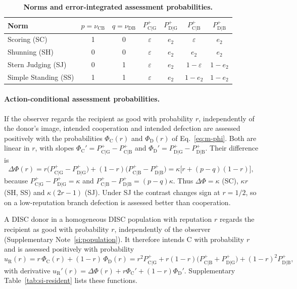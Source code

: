 \documentclass[fleqn,10pt]{wlscirep}
\newcommand{\Pp}[1]{P^{+}_{\mathrm{#1}}}   %
\newcommand{\PhiC}{\Phi_{\mathrm{C}}}
\newcommand{\PhiD}{\Phi_{\mathrm{D}}}
\theoremstyle{plain}
\begin{document}
\begin{table}[!htbp]
\centering
\caption{\textbf{Norms and error-integrated assessment probabilities.}}
\label{tab:si-norms}
\small
\begin{tabular}{@{}lcccccc@{}}
\toprule
Norm & $p=\nu_{\mathrm{CB}}$ & $q=\nu_{\mathrm{DB}}$ & $\Pp{C|G}$ & $\Pp{D|G}$ & $\Pp{C|B}$ & $\Pp{D|B}$\\
\midrule
Scoring (SC) & 1 & 0 & $\varepsilon$ & $e_2$ & $\varepsilon$ & $e_2$\\
Shunning (SH) & 0 & 0 & $\varepsilon$ & $e_2$ & $e_2$ & $e_2$\\
Stern Judging (SJ) & 0 & 1 & $\varepsilon$ & $e_2$ & $1-\varepsilon$ & $1-e_2$\\
Simple Standing (SS) & 1 & 1 & $\varepsilon$ & $e_2$ & $1-e_2$ & $1-e_2$\\
\bottomrule
\end{tabular}
\end{table}

\paragraph{Action-conditional assessment probabilities.} If the observer regards the recipient as good with probability $r$, independently of the donor's image, intended cooperation and intended defection are assessed positively with the probabilities $\PhiC(r)$ and $\PhiD(r)$ of Eq.~\eqref{eq:m-phi}. Both are linear in $r$, with slopes $\PhiC'=\Pp{C|G}-\Pp{C|B}$ and $\PhiD'=\Pp{D|G}-\Pp{D|B}$. Their difference is
\begin{equation}
\Delta\Phi(r)=r\bigl(\Pp{C|G}-\Pp{D|G}\bigr)+(1-r)\bigl(\Pp{C|B}-\Pp{D|B}\bigr)=\kappa\bigl[r+(p-q)(1-r)\bigr],
\label{eq:s-contrast}
\end{equation}
because $\Pp{C|G}-\Pp{D|G}=\kappa$ and $\Pp{C|B}-\Pp{D|B}=(p-q)\kappa$. Thus $\Delta\Phi=\kappa$ (SC), $\kappa r$ (SH, SS) and $\kappa(2r-1)$ (SJ). Under SJ the contrast changes sign at $r=1/2$, so on a low-reputation branch defection is assessed better than cooperation.

A DISC donor in a homogeneous DISC population with reputation $r$ regards the recipient as good with probability $r$, independently of the observer (Supplementary Note~\ref{si:population}). It therefore intends C with probability $r$ and is assessed positively with probability
\begin{equation}
u_{\mathrm R}(r)=r\,\PhiC(r)+(1-r)\,\PhiD(r)=r^2\Pp{C|G}+r(1-r)\bigl(\Pp{C|B}+\Pp{D|G}\bigr)+(1-r)^2\Pp{D|B},
\label{eq:s-resident}
\end{equation}
with derivative $u_{\mathrm R}'(r)=\Delta\Phi(r)+r\PhiC'+(1-r)\PhiD'$. Supplementary Table~\ref{tab:si-resident} lists these functions.
\end{document}
